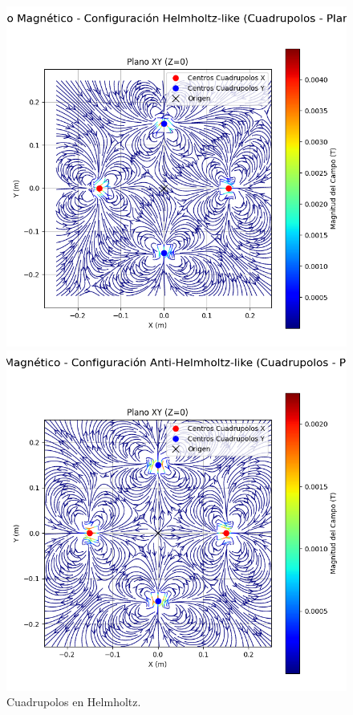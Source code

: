 \begin{figure}[H] %
  \centering
  \begin{minipage}[b]{0.48\textwidth} %
    \includegraphics[width=\linewidth, trim={0cm 2cm 0cm 1cm}, clip]{Sections/Figures/helmholtz_quadrupoles_xy_field.png} %
    \caption{Cuadrupolos en Helmholtz.}
    \label{fig:helmholtz_quadrupoles_xy_field}
  \end{minipage}
  \hfill
  \begin{minipage}[b]{0.48\textwidth} %
    \includegraphics[width=\linewidth, trim={0cm 2cm 0cm 1cm}, clip]{Sections/Figures/antihelmholtz_quadrupoles_xy_field.png} %

\end{minipage}
\end{figure}
